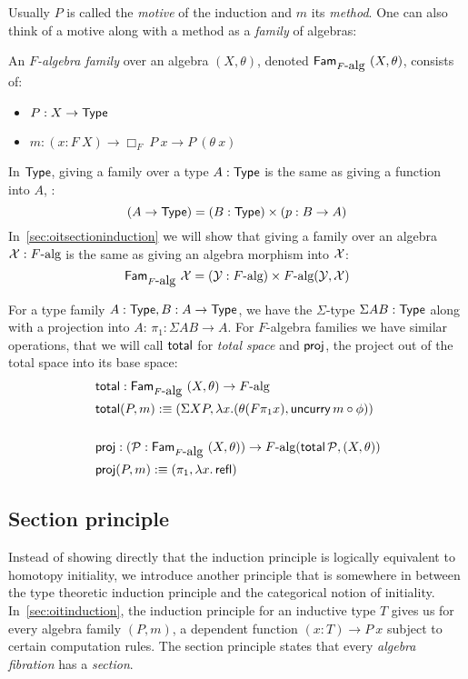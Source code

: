 \documentclass[a4paper,10pt]{article}
\begin{document}
Usually $P$ is called the \emph{motive} of the induction and $m$ its
\emph{method}. One can also think of a motive along with a method as a
\emph{family} of algebras:

\begin{defn}
  An \emph{$F$-algebra family} over an algebra $(X,\theta)$, denoted
  $\mathsf{Fam}_{F\mbox{-alg}}\ (X,\theta)$, consists of:

  \begin{itemize}
  \item $P : X \to \mathsf{Type}$
  \item $m : (x : F\ X) \to \Box_F\ P\ x \to P\ (\theta\ x)$
  \end{itemize}
\end{defn}

In $\mathsf{Type}$, giving a family over a type $A : \mathsf{Type}$ is the same as
giving a function into $A$, \ie:
$$
(A \to \mathsf{Type}) = (B : \mathsf{Type}) \times (p : B \to A)
$$
In~\cref{sec:oitsectioninduction} we will show that giving a
family over an algebra $\mathcal{X} : F\mbox{-alg}$ is the same as giving an
algebra morphism into $\mathcal{X}$:
$$
\mathsf{Fam}_{F\mbox{-alg}}\ \mathcal{X} = (\mathcal{Y} : F\mbox{-alg}) \times F\mbox{-alg}(\mathcal{Y},\mathcal{X})
$$

For a type family $A : \mathsf{Type}, B : A \to \mathsf{Type}$, we have the
$\Sigma$-type $\Sigma A B : \mathsf{Type}$ along with a projection into $A$:
$\pi_1 : \Sigma A B \to A$. For $F$-algebra families we have similar
operations, that we will call $\operatorname{\mathsf{total}}$ for \emph{total space} and
$\operatorname{\mathsf{proj}}$, the project out of the total space into its base space:
\begin{align*}
  &\operatorname{\mathsf{total}} : \mathsf{Fam}_{F\mbox{-alg}}\ (X,\theta) \to F\mbox{-alg} \\
  &\operatorname{\mathsf{total}} (P, m) :\equiv (\Sigma X P, \lambda x . (\theta (F \pi_1 x) , \operatorname{\mathsf{uncurry}} m \circ \phi)) \\
  &\\
  &\operatorname{\mathsf{proj}} : (\mathcal{P} : \mathsf{Fam}_{F\mbox{-alg}}\ (X,\theta)) \to F\mbox{-alg}(\operatorname{\mathsf{total}} \mathcal{P}, (X,\theta)) \\
  &\operatorname{\mathsf{proj}} (P, m) :\equiv (\pi_1 , \lambda x . \operatorname{\mathsf{refl}})
\end{align*}

\subsection{Section principle}
\label{sec:oitsection}

Instead of showing directly that the induction principle is logically
equivalent to homotopy initiality, we introduce another principle that
is somewhere in between the type theoretic induction principle and the
categorical notion of initiality. In~\cref{sec:oitinduction}, the
induction principle for an inductive type $T$ gives us for every
algebra family $(P,m)$, a dependent function $(x : T) \to P\ x$
subject to certain computation rules. The section principle states
that every \emph{algebra fibration} has a \emph{section}.
\end{document}
